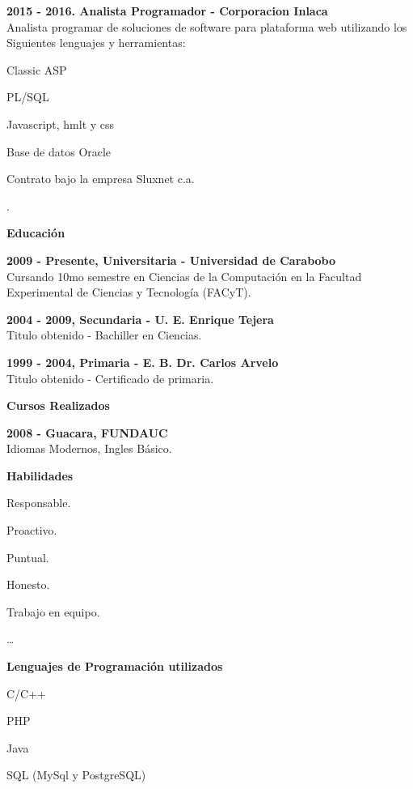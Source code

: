 \documentclass[a4paper,12pt,final]{memoir}
\newcommand{\Sep}{\vspace{1.5em}}
\newcommand{\SmallSep}{\vspace{0.5em}}
\newcommand{\CVSection}[1]
	{\Large\textbf{#1}\par
	\SmallSep\normalsize\normalfont}
\newcommand{\CVItem}[1]
	{\textbf{\color{RoyalBlue} #1}}
\begin{document}
\SmallSep

\CVItem{2015 - 2016. Analista Programador - Corporacion Inlaca}\\
Analista programar de soluciones de software para plataforma web utilizando los
Siguientes lenguajes y herramientas:
\begin{compactitem}[\color{RoyalBlue}$\circ$]
	\item Classic ASP
	\item PL/SQL
	\item Javascript, hmlt y css
	\item Base de datos Oracle
\end{compactitem}
Contrato bajo la empresa Sluxnet c.a.

\newpage
.
\normalsize
\framebreak

\CVSection{Educación}
\CVItem{2009 - Presente, Universitaria - Universidad de Carabobo}\\
Cursando 10mo semestre en Ciencias de la Computación en la Facultad Experimental
de Ciencias y Tecnología (FACyT).
\SmallSep

\CVItem{2004 - 2009, Secundaria - U. E. Enrique Tejera}\\
Titulo obtenido - Bachiller en Ciencias.
\SmallSep

\CVItem{1999 - 2004, Primaria - E. B. Dr. Carlos Arvelo}\\
Titulo obtenido - Certificado de primaria.

\Sep

\CVSection{Cursos Realizados}
\CVItem{2008 - Guacara, FUNDAUC}\\
Idiomas Modernos, Ingles Básico.
\Sep


\CVSection{Habilidades}
\begin{multicols}{3}
\begin{compactitem}[\color{RoyalBlue}$\circ$]
	\item Responsable.
	\item Proactivo. 
	\item Puntual.
	\item Honesto.
	\item Trabajo en equipo.
	\item \dots
\end{compactitem}
\end{multicols}
\SmallSep

\CVItem{Lenguajes de Programación utilizados}
\begin{multicols}{2}
\begin{compactitem}[\color{RoyalBlue}$\circ$]
	\item C/C++ 
	\item PHP 
	\item Java
	\item SQL (MySql y PostgreSQL) 
\end{compactitem}
\end{multicols}
\Sep 


\end{document}
